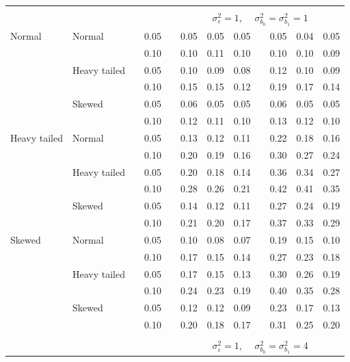 \documentclass[12pt]{article} %
\begin{document}
\begin{table}[ht]
\begin{scriptsize}
\begin{center}
\begin{tabular}{ll p{.1cm} c p{.1cm} rrr p{.1cm} rrr}
&&&&&&&&&&&\\
& && && \multicolumn{7}{c}{$\sigma_{\varepsilon}^2 = 1$, \ \ $\sigma_{b_0}^2 = \sigma_{b_1}^2 = 1$} \\ \cline{6-12}
Normal       & Normal       && 0.05 &&  0.05 & 0.05 & 0.05 && 0.05 & 0.04 & 0.05 \\ 
             &              && 0.10 &&  0.10 & 0.11 & 0.10 && 0.10 & 0.10 & 0.09 \\ 
             & Heavy tailed && 0.05 &&  0.10 & 0.09 & 0.08 && 0.12 & 0.10 & 0.09 \\ 
             &              && 0.10 &&  0.15 & 0.15 & 0.12 && 0.19 & 0.17 & 0.14 \\ 
             & Skewed       && 0.05 &&  0.06 & 0.05 & 0.05 && 0.06 & 0.05 & 0.05 \\ 
             &              && 0.10 &&  0.12 & 0.11 & 0.10 && 0.13 & 0.12 & 0.10 \\ 
Heavy tailed & Normal       && 0.05 &&  0.13 & 0.12 & 0.11 && 0.22 & 0.18 & 0.16 \\ 
             &              && 0.10 &&  0.20 & 0.19 & 0.16 && 0.30 & 0.27 & 0.24 \\ 
             & Heavy tailed && 0.05 &&  0.20 & 0.18 & 0.14 && 0.36 & 0.34 & 0.27 \\ 
             &              && 0.10 &&  0.28 & 0.26 & 0.21 && 0.42 & 0.41 & 0.35 \\ 
             & Skewed       && 0.05 &&  0.14 & 0.12 & 0.11 && 0.27 & 0.24 & 0.19 \\ 
             &              && 0.10 &&  0.21 & 0.20 & 0.17 && 0.37 & 0.33 & 0.29 \\ 
Skewed       & Normal       && 0.05 &&  0.10 & 0.08 & 0.07 && 0.19 & 0.15 & 0.10 \\ 
             &              && 0.10 &&  0.17 & 0.15 & 0.14 && 0.27 & 0.23 & 0.18 \\ 
             & Heavy tailed && 0.05 &&  0.17 & 0.15 & 0.13 && 0.30 & 0.26 & 0.19 \\ 
             &              && 0.10 &&  0.24 & 0.23 & 0.19 && 0.40 & 0.35 & 0.28 \\ 
             & Skewed       && 0.05 &&  0.12 & 0.12 & 0.09 && 0.23 & 0.17 & 0.13 \\ 
             &              && 0.10 &&  0.20 & 0.18 & 0.17 && 0.31 & 0.25 & 0.20 \\ 


&&&&&&&&&&&\\
& && && \multicolumn{7}{c}{$\sigma_{\varepsilon}^2 = 1$, \ \ $\sigma_{b_0}^2 = \sigma_{b_1}^2 = 4$} \\ \cline{6-12}


\hline
\end{tabular}
\end{center}
\end{scriptsize}
\end{table}
\end{document}
